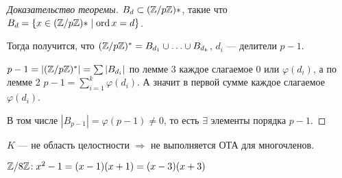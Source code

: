 \begin{proof}[Доказательство теоремы] 
    $B_d \subset (\mathbb{Z} / p\mathbb{Z})*$, такие что $B_d = \{x \in (\mathbb{Z} / p \mathbb{Z})* \mid \operatorname{ord} x = d\}$. 

    Тогда получится, что  $(\mathbb{Z} / p \mathbb{Z})^* = B_{d_1} \cup \ldots \cup B_{d_k}$, $d_i$ --- делители $p - 1$. 

    $p-1 = |(\mathbb{Z} / p \mathbb{Z})^*| = \sum |B_{d_i}|$ по лемме 3  каждое слагаемое  $0$ или  $\varphi(d_i)$, а по лемме 2 $p - 1 = \sum_{i = 1}^k \varphi(d_i)$. А значит в первой сумме каждое слагаемое  $\varphi(d_i)$. 

    В том числе  $|B_{p-1}| = \varphi(p - 1) \neq 0$, то есть  $\exists $ элементы порядка  $p-1$.
\end{proof}
\begin{remark}
    $K$ --- не область целостности  $\Rightarrow$ не выполняется ОТА для многочленов.
    
    $\mathbb{Z} / 8\mathbb{Z}\!: x^2-1 = (x-1)(x+1) = (x-3)(x+3)$
\end{remark}
